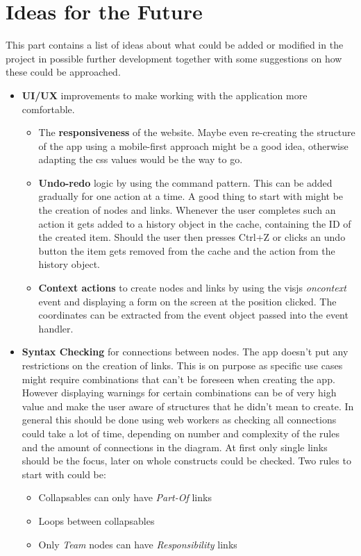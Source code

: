 \chapter{Ideas for the Future}
\label{chap:Future}
This part contains a list of ideas about what could be added or modified in the project in possible further development together with some suggestions on how these could be approached.
\begin{itemize}
\item \textbf{UI/UX} improvements to make working with the application more comfortable.
\begin{itemize}
\item The \textbf{responsiveness} of the website. Maybe even re-creating the structure of the app using a mobile-first approach might be a good idea, otherwise adapting the css values would be the way to go.

\item \textbf{Undo-redo} logic by using the command pattern. This can be added gradually for one action at a time. A good thing to start with might be the creation of nodes and links. Whenever the user completes such an action it gets added to a history object in the cache, containing the ID of the created item. Should the user then presses Ctrl+Z or clicks an undo button the item gets removed from the cache and the action from the history object.

\item \textbf{Context actions} to create nodes and links by using the visjs \emph{oncontext} event and displaying a form on the screen at the position clicked. The coordinates can be extracted from the event object passed into the event handler.
\end{itemize}

\item \textbf{Syntax Checking} for connections between nodes. The app doesn't put any restrictions on the creation of links. This is on purpose as specific use cases might require combinations that can't be foreseen when creating the app. However displaying warnings for certain combinations can be of very high value and make the user aware of structures that he didn't mean to create. In general this should be done using web workers as checking all connections could take a lot of time, depending on number and complexity of the rules and the amount of connections in the diagram. At first only single links should be the focus, later on whole constructs could be checked. Two rules to start with could be:
\begin{itemize}
\item Collapsables can only have \emph{Part-Of} links
\item Loops between collapsables
\item Only \emph{Team} nodes can have \emph{Responsibility} links
\end{itemize}


\end{itemize}
